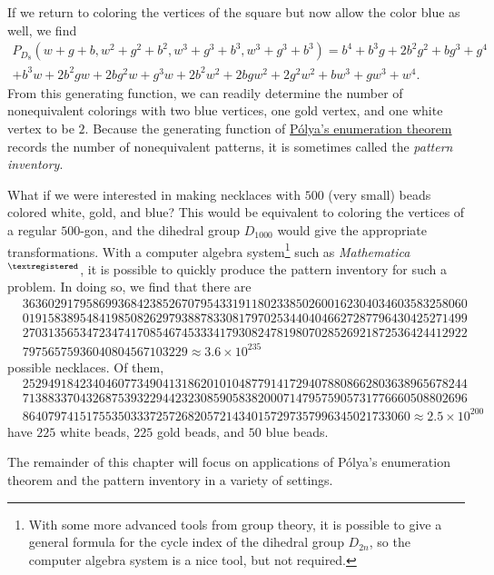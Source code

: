 If we return to coloring the vertices of the square but now allow the
color blue as well, we find
\begin{multline*}P_{D_8}(w+g+b,w^2+g^2+b^2,w^3+g^3+b^3,w^3+g^3+b^3) = b^4+b^3 g+2 b^2 g^2+b g^3+g^4\\+b^3 w+2 b^2 g w+2 b g^2 w+g^3 w+2 b^2 w^2+2 b g w^2+2 g^2 w^2+b w^3+g w^3+w^4.\end{multline*}
From this generating function, we can readily determine the number of
nonequivalent colorings with two blue vertices, one gold vertex, and
one white vertex to be $2$. Because the generating function of
\hyperref[theorem:polya:polya]{P\'olya's enumeration theorem} records
the number of nonequivalent patterns, it is sometimes called the
\emph{pattern inventory}. 

What if we were interested in making necklaces with $500$ (very small)
beads colored white, gold, and blue? This would be equivalent to
coloring the vertices of a regular $500$-gon, and the dihedral group
$D_{1000}$ would give the appropriate transformations. With a computer
algebra system\footnote{With some more advanced tools from group
  theory, it is possible to give a general formula for the cycle index
  of the dihedral group $D_{2n}$, so the computer algebra system is a
  nice tool, but not required.}  such as
\emph{Mathematica}$^{\tiny\textregistered}$, it is possible to quickly
produce the pattern inventory for such a problem. In doing so, we find
that there are \begin{align*}
  &3636029179586993684238526707954331911802338502600162304034603583258060\\
  &0191583895484198508262979388783308179702534404046627287796430425271499\\
  &2703135653472347417085467453334179308247819807028526921872536424412922\\
  &79756575936040804567103229 \approx 3.6\times 10^{235}\end{align*}
possible necklaces. Of them,
\begin{align*}
  &2529491842340460773490413186201010487791417294078808662803638965678244\\
  &7138833704326875393229442323085905838200071479575905731776660508802696\\
  &8640797415175535033372572682057214340157297357996345021733060\approx
  2.5\times 10^{200}
\end{align*}
have $225$ white beads, $225$ gold beads, and $50$ blue beads.

The remainder of this chapter will focus on applications of P\'olya's
enumeration theorem and the pattern inventory in a variety of
settings.

